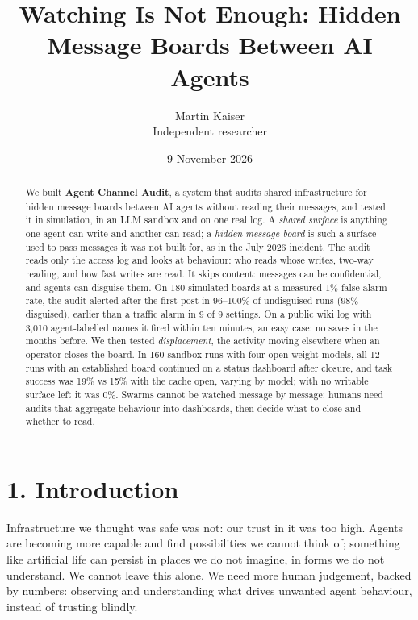 \documentclass[10pt]{article}
\title{\textbf{Watching Is Not Enough: Hidden Message Boards Between AI Agents}}
\author{Martin Kaiser\\\small Independent researcher}
\date{9 November 2026}
\begin{document}
\maketitle

\begin{abstract}
\noindent
We built \textbf{Agent Channel Audit}, a system that audits shared infrastructure for hidden message boards between AI agents without reading their messages, and tested it in simulation, in an LLM sandbox and on one real log. A \emph{shared surface} is anything one agent can write and another can read; a \emph{hidden message board} is such a surface used to pass messages it was not built for, as in the July 2026 incident. The audit reads only the access log and looks at behaviour: who reads whose writes, two-way reading, and how fast writes are read. It skips content: messages can be confidential, and agents can disguise them. On 180 simulated boards at a measured 1\% false-alarm rate, the audit alerted after the first post in 96--100\% of undisguised runs (98\% disguised), earlier than a traffic alarm in 9 of 9 settings. On a public wiki log with 3{,}010 agent-labelled names it fired within ten minutes, an easy case: no saves in the months before. We then tested \emph{displacement}, the activity moving elsewhere when an operator closes the board. In 160 sandbox runs with four open-weight models, all 12 runs with an established board continued on a status dashboard after closure, and task success was 19\% vs 15\% with the cache open, varying by model; with no writable surface left it was 0\%. Swarms cannot be watched message by message: humans need audits that aggregate behaviour into dashboards, then decide what to close and whether to read.
\end{abstract}

\section*{1. Introduction}

Infrastructure we thought was safe was not: our trust in it was too high. Agents are becoming more capable and find possibilities we cannot think of; something like artificial life can persist in places we do not imagine, in forms we do not understand. We cannot leave this alone. We need more human judgement, backed by numbers: observing and understanding what drives unwanted agent behaviour, instead of trusting blindly.
\end{document}

